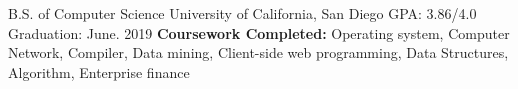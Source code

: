 

\begin{cventries}

  \cventry
    {B.S. of Computer Science} %
    {University of California, San Diego} %
    {GPA: 3.86/4.0} %
    {Graduation: June. 2019} %
    {\textbf{Coursework Completed:} Operating system, Computer Network, Compiler, Data mining, Client-side web programming, Data Structures, Algorithm, Enterprise finance}

\end{cventries}